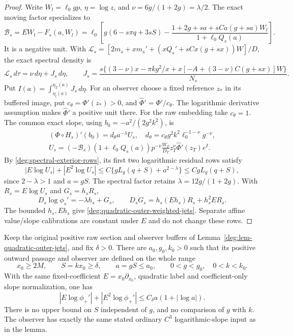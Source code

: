 \begin{proof}
Write \(W_l=\ell_0gp\), \(\eta=\log z\), and
\(\nu=6g/(1+2g)=\lambda/2\).
The exact moving factor specializes to
\begin{equation}\label{deg:quadratic-outer-moving-factor}
 \mathscr B_s=EW_l-F_s(a,W_l)
 =\ell_0\left[g(6-s\pi q+3sS)
 -\frac{1+2g+sa+sCa(g+sa)W_l}{1+\ell_0Q_s(a)}\right].
\end{equation}
It is a negative unit. With
\(\mathscr L_s=[2m_s+x m_s'+(xQ_s'+sCx(g+sx))W]/D\),
the exact spectral density is
\begin{equation}\label{deg:quadratic-outer-density}
 \mathscr L_s\,d\tau=\nu\,d\eta+J_s\,d\eta,\qquad
 J_s=\frac{s\{(3-\nu)x-\pi kg^2/x
       +x[-A+(3-\nu)C(g+sx)]W\}}{N_s} .
\end{equation}
Put \(I(a)=\int_{\eta_l(a)}^{\eta_T(a)}J_s\,d\eta\).
For an observer choose a fixed reference \(z_*\) in its buffered image,
put \(c_\theta=\Phi'(z_*)>0\), and \(\widehat\Phi'=\Phi'/c_\theta\).
The logarithmic derivative assumption makes \(\widehat\Phi'\) a positive
unit there. For the raw embedding take \(c_\theta=1\).
The common exact slope, using \(b_0=-a^2/(2g^2k^2)\), is
\begin{equation}\label{deg:quadratic-outer-exact-slope}
 \begin{gathered}
 (\Phi\circ H_s)'(b_0)=d_\theta a^{-\lambda}U_s,
 \quad d_\theta=c_\theta g^2k^2\ell_0^{-1-\nu}g^{-\nu},\\
 U_s=(-\mathscr B_s)(1+\ell_0Q_s(a))p^{-\nu}
       \frac{W_T}{D_T}z_T^\nu\widehat\Phi'(z_T)e^I .
 \end{gathered}
\end{equation}
By \eqref{deg:spectral-exterior-rows}, its first two logarithmic residual
rows satisfy
\[
 |E\log U_s|+|E^2\log U_s|
 \le C\{gL_g(q+S)+a^{2-\lambda}\}\le CgL_g(q+S),
\]
since \(2-\lambda>1\) and \(a=gS\). The spectral factor retains
\(\lambda=12g/(1+2g)\). With \(R_s=E\log U_s\) and \(G_s=h_sR_s\),
\[
 D_s\log\phi_s'=-\lambda h_s+G_s,\qquad
 D_sG_s=h_s(Eh_s)R_s+h_s^2ER_s.
\]
The bounded \(h_s,Eh_s\) give
\eqref{deg:quadratic-outer-weighted-jets}. Separate affine value/slope
calibrations are constant under \(E\) and do not change these rows.
\end{proof}

\begin{corollary}\label{deg:cor-positive-large-S-outer}
Keep the original positive raw section and observer buffers of
Lemma~\ref{deg:lem-quadratic-outer-jets}, and fix \(\delta>0\).
There are \(a_0,g_0,k_0>0\) such that its positive outward passage and
observer are defined on the whole range
\[
 x_0\ge2M,\qquad S=kx_0\ge\delta,\qquad
 a=gS\le a_0,\qquad 0<g<g_0,\quad0<k<k_0.
\]
With the same fixed-coefficient \(E=x_0\partial_{x_0}\), quadratic
label and coefficient-only slope normalization, one has
\begin{equation}\label{deg:positive-large-S-direct-jets}
 |E\log\phi_+'|+|E^2\log\phi_+'|
 \le C_\delta a(1+|\log a|).
\end{equation}
There is no upper bound on \(S\) independent of \(g\), and no comparison
of \(g\) with \(k\). The observer has exactly the same stated
ordinary \(C^3\) logarithmic-slope input as in the lemma.
\end{corollary}

